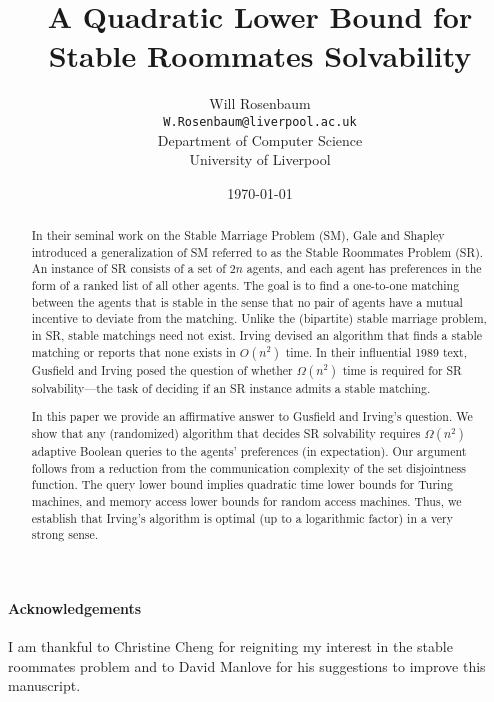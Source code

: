\documentclass[a4paper,11pt]{article}
\title{A Quadratic Lower Bound for Stable Roommates Solvability}
\author{Will Rosenbaum\\
\texttt{W.Rosenbaum@liverpool.ac.uk}\\
Department of Computer Science\\
University of Liverpool
}
\date{\today}
\begin{document}
\maketitle

\begin{abstract}
    In their seminal work on the Stable Marriage Problem (SM), Gale and Shapley introduced a generalization of SM referred to as the Stable Roommates Problem (SR). An instance of SR consists of a set of $2n$ agents, and each agent has preferences in the form of a ranked list of all other agents. The goal is to find a one-to-one matching between the agents that is stable in the sense that no pair of agents have a mutual incentive to deviate from the matching. Unlike the (bipartite) stable marriage problem, in SR, stable matchings need not exist. Irving devised an algorithm that finds a stable matching or reports that none exists in $O(n^2)$ time. In their influential 1989 text, Gusfield and Irving posed the question of whether $\Omega(n^2)$ time is required for SR solvability---the task of deciding if an SR instance admits a stable matching.

    In this paper we provide an affirmative answer to Gusfield and Irving's question. We show that any (randomized) algorithm that decides SR solvability requires $\Omega(n^2)$ adaptive Boolean queries to the agents' preferences (in expectation). Our argument follows from a reduction from the communication complexity of the set disjointness function. The query lower bound implies quadratic time lower bounds for Turing machines, and memory access lower bounds for random access machines. Thus, we establish that Irving's algorithm is optimal (up to a logarithmic factor) in a very strong sense.
\end{abstract}





\paragraph{Acknowledgements} I am thankful to Christine Cheng for reigniting my interest in the stable roommates problem and to David Manlove for his suggestions to improve this manuscript.



\end{document}
